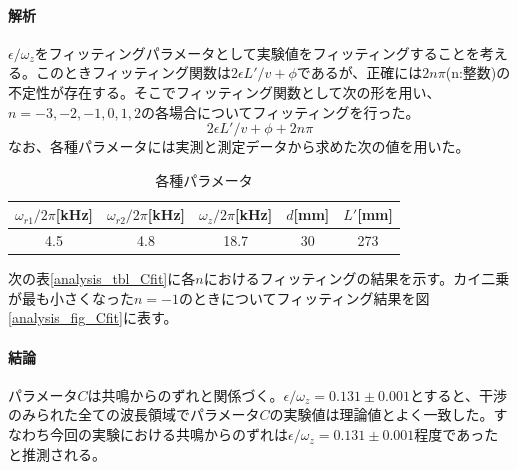 \paragraph{解析}
$\epsilon/\omega_z$をフィッティングパラメータとして実験値をフィッティングすることを考える。このときフィッティング関数は$2\epsilon L'/v +\phi$であるが、正確には$2n\pi$(n:整数)の不定性が存在する。そこでフィッティング関数として次の形を用い、$n=-3,-2,-1,0,1,2$の各場合についてフィッティングを行った。
\begin{equation}
2\epsilon L'/v +\phi+2n\pi
\end{equation}
なお、各種パラメータには実測と測定データから求めた次の値を用いた。
\begin{table}[h]
\centering
\caption{各種パラメータ}\label{analysis_tbl_parameter}
\begin{tabular}{ccccc}
$\omega_{r1}/2\pi$[kHz]&$\omega_{r2}/2\pi$[kHz]&$\omega_{z}/2\pi$[kHz]&$d$[mm]&$L'$[mm]\\ \hline
4.5&4.8&18.7&30&273
\end{tabular}
\end{table}

次の表\ref{analysis_tbl_Cfit}に各$n$におけるフィッティングの結果を示す。カイ二乗が最も小さくなった$n=-1$のときについてフィッティング結果を図\ref{analysis_fig_Cfit}に表す。

\paragraph{結論}
パラメータ$C$は共鳴からのずれと関係づく。$\epsilon/\omega_z=0.131\pm0.001$とすると、干渉のみられた全ての波長領域でパラメータ$C$の実験値は理論値とよく一致した。すなわち今回の実験における共鳴からのずれは$\epsilon/\omega_z=0.131\pm0.001$程度であったと推測される。

